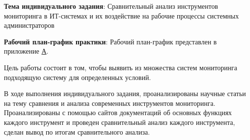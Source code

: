 
\textbf{Тема индивидуального задания}: 
Сравнительный анализ инструментов мониторинга в ИТ-системах и их воздействие на рабочие процессы системных администраторов

\textbf{Рабочий план-график практики}:
Рабочий план-график представлен в приложение \hyperlink{app-a}{А}.

Цель работы состоит в том, чтобы выявить из множества систем мониторинга подходящую систему для определенных условий.

В ходе выполнения индивидуального задания, проанализированы научные статьи 
на тему сравнения и анализа современных инструментов мониторинга. Проанализированы 
с помощью сайтов документаций об основных функциях каждого инструмент и проведен сравнительный анализ каждого
инструмента, сделан вывод по итогам сравнительного анализа.

\clearpage